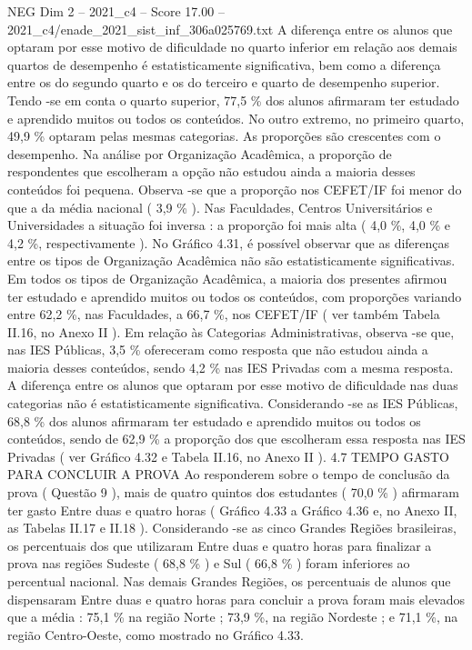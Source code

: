 \begin{textsample}{NEG Dim 2 – 2021\_c4 – Score 17.00 – 2021\_c4/enade\_2021\_sist\_inf\_306a025769.txt}
A diferença entre os alunos que optaram por esse motivo de dificuldade no quarto inferior em relação aos demais quartos de desempenho é estatisticamente significativa, bem como a diferença entre os do segundo quarto e os do terceiro e quarto de desempenho superior.
Tendo -se em conta o quarto superior, 77,5 \% dos alunos afirmaram ter estudado e aprendido muitos ou todos os conteúdos.
No outro extremo, no primeiro quarto, 49,9 \% optaram pelas mesmas categorias.
As proporções são crescentes com o desempenho.
Na análise por Organização Acadêmica, a proporção de respondentes que escolheram a opção não estudou ainda a maioria desses conteúdos foi pequena.
Observa -se que a proporção nos CEFET/IF foi menor do que a da média nacional ( 3,9 \% ).
Nas Faculdades, Centros Universitários e Universidades a situação foi inversa : a proporção foi mais alta ( 4,0 \%, 4,0 \% e 4,2 \%, respectivamente ).
No Gráfico 4.31, é possível observar que as diferenças entre os tipos de Organização Acadêmica não são estatisticamente significativas.
Em todos os tipos de Organização Acadêmica, a maioria dos presentes afirmou ter estudado e aprendido muitos ou todos os conteúdos, com proporções variando entre 62,2 \%, nas Faculdades, a 66,7 \%, nos CEFET/IF ( ver também Tabela II.16, no Anexo II ).
Em relação às Categorias Administrativas, observa -se que, nas IES Públicas, 3,5 \% ofereceram como resposta que não estudou ainda a maioria desses conteúdos, sendo 4,2 \% nas IES Privadas com a mesma resposta.
A diferença entre os alunos que optaram por esse motivo de dificuldade nas duas categorias não é estatisticamente significativa.
Considerando -se as IES Públicas, 68,8 \% dos alunos afirmaram ter estudado e aprendido muitos ou todos os conteúdos, sendo de 62,9 \% a proporção dos que escolheram essa resposta nas IES Privadas ( ver Gráfico 4.32 e Tabela II.16, no Anexo II ). 4.7 TEMPO GASTO PARA CONCLUIR A PROVA Ao responderem sobre o tempo de conclusão da prova ( Questão 9 ), mais de quatro quintos dos estudantes ( 70,0 \% ) afirmaram ter gasto Entre duas e quatro horas ( Gráfico 4.33 a Gráfico 4.36 e, no Anexo II, as Tabelas II.17 e II.18 ).
Considerando -se as cinco Grandes Regiões brasileiras, os percentuais dos que utilizaram Entre duas e quatro horas para finalizar a prova nas regiões Sudeste ( 68,8 \% ) e Sul ( 66,8 \% ) foram inferiores ao percentual nacional.
Nas demais Grandes Regiões, os percentuais de alunos que dispensaram Entre duas e quatro horas para concluir a prova foram mais elevados que a média : 75,1 \% na região Norte ; 73,9 \%, na região Nordeste ; e 71,1 \%, na região Centro-Oeste, como mostrado no Gráfico 4.33.

\end{textsample}
